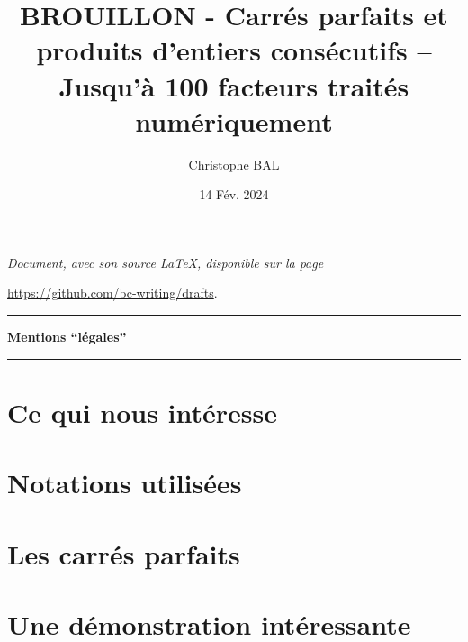 \documentclass[12pt]{amsart}
\newcommand\contentdir{\jobname}
\begin{document}
\title{BROUILLON - Carrés parfaits et produits d'entiers consécutifs -- Jusqu'à 100 facteurs traités numériquement}
\author{Christophe BAL}
\date{14 Fév. 2024}

\maketitle

\begin{center}
	\itshape
	Document, avec son source \LaTeX, disponible sur la page
	
	\url{https://github.com/bc-writing/drafts}.
\end{center}


\bigskip


\begin{center}
	\hrule\vspace{.3em}
	{
		\fontsize{1.35em}{1em}\selectfont
		\textbf{Mentions \enquote{légales}}
	}
			
	\vspace{0.45em}
	\small
	\doclicenseThis
	\hrule
\end{center}


\setcounter{tocdepth}{2}
\tableofcontents




\newpage
\section{Ce qui nous intéresse}






\bigskip
\section{Notations utilisées}






\section{Les carrés parfaits} \label{case-1}






\section{Une démonstration intéressante} \label{case-10}
\end{document}
